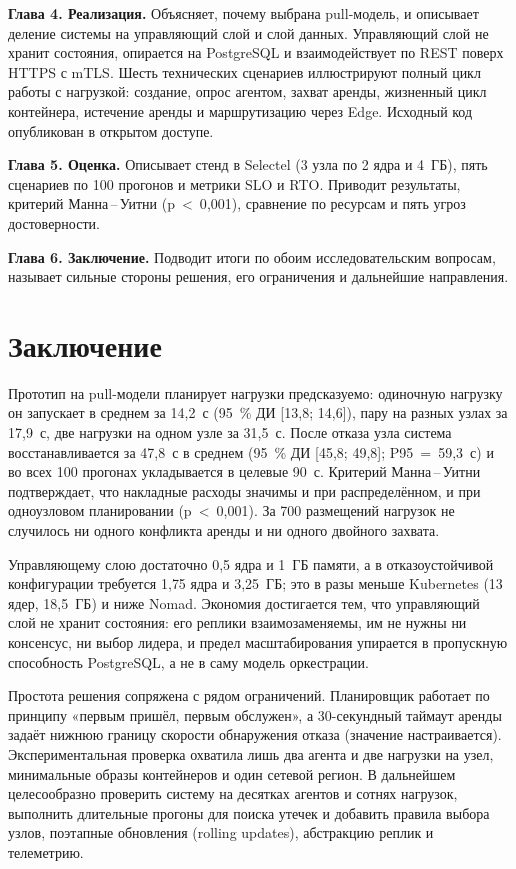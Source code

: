 \documentclass[oneside,final,14pt,a4paper]{extreport}
\begin{document}
\textbf{Глава 4. Реализация.} Объясняет, почему выбрана pull-модель, и описывает
деление системы на управляющий слой и слой данных. Управляющий слой не хранит
состояния, опирается на PostgreSQL и взаимодействует по REST поверх HTTPS с mTLS.
Шесть технических сценариев иллюстрируют полный цикл работы с нагрузкой: создание,
опрос агентом, захват аренды, жизненный цикл контейнера, истечение аренды и
маршрутизацию через Edge. Исходный код опубликован в открытом доступе.

\textbf{Глава 5. Оценка.} Описывает стенд в Selectel (3 узла по 2 ядра и 4~ГБ),
пять сценариев по 100 прогонов и метрики SLO и RTO. Приводит результаты, критерий
Манна\,–\,Уитни (p~<~0{,}001), сравнение по ресурсам и пять угроз достоверности.

\textbf{Глава 6. Заключение.} Подводит итоги по обоим исследовательским вопросам,
называет сильные стороны решения, его ограничения и дальнейшие направления.

\chapter*{Заключение}

Прототип на pull-модели планирует нагрузки предсказуемо: одиночную нагрузку он
запускает в среднем за 14{,}2~с (95~\% ДИ [13{,}8; 14{,}6]), пару на разных узлах
за 17{,}9~с, две нагрузки на одном узле за 31{,}5~с. После отказа узла система
восстанавливается за 47{,}8~с в среднем (95~\% ДИ [45{,}8; 49{,}8];
P95~=~59{,}3~с) и во всех 100 прогонах укладывается в целевые 90~с. Критерий
Манна\,–\,Уитни подтверждает, что накладные расходы значимы и при распределённом,
и при одноузловом планировании (p~<~0{,}001). За 700 размещений нагрузок не
случилось ни одного конфликта аренды и ни одного двойного захвата.

Управляющему слою достаточно 0{,}5 ядра и 1~ГБ памяти, а в отказоустойчивой
конфигурации требуется 1{,}75 ядра и 3{,}25~ГБ; это в разы меньше Kubernetes
(13 ядер, 18{,}5~ГБ) и ниже Nomad. Экономия достигается тем, что управляющий слой
не хранит состояния: его реплики взаимозаменяемы, им не нужны ни консенсус, ни
выбор лидера, и предел масштабирования упирается в пропускную способность
PostgreSQL, а не в саму модель оркестрации.

Простота решения сопряжена с рядом ограничений. Планировщик работает по принципу
«первым пришёл, первым обслужен», а 30-секундный таймаут аренды задаёт нижнюю
границу скорости обнаружения отказа (значение настраивается). Экспериментальная
проверка охватила лишь два агента и две нагрузки на узел, минимальные образы
контейнеров и один сетевой регион. В дальнейшем целесообразно проверить систему
на десятках агентов и сотнях нагрузок, выполнить длительные прогоны для поиска
утечек и добавить правила выбора узлов, поэтапные обновления (rolling updates),
абстракцию реплик и телеметрию.

\printbibliography[heading=bibintoc, title={Список использованных источников}]
\end{document}
